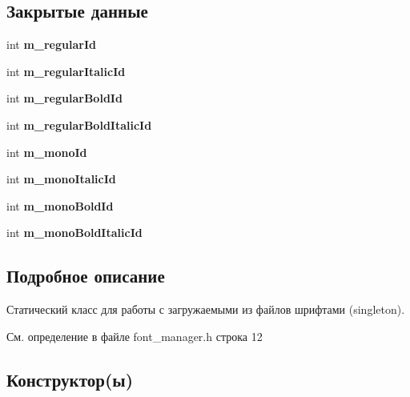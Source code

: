 \subsection*{Закрытые данные}
\begin{DoxyCompactItemize}
\item 
\hypertarget{class_font_manager_a646476403ee76b0ff2a1b6c8cd8dd167}{}\label{class_font_manager_a646476403ee76b0ff2a1b6c8cd8dd167} 
int {\bfseries m\+\_\+regular\+Id}
\item 
\hypertarget{class_font_manager_a378686fcdece0835591b5330dbc98523}{}\label{class_font_manager_a378686fcdece0835591b5330dbc98523} 
int {\bfseries m\+\_\+regular\+Italic\+Id}
\item 
\hypertarget{class_font_manager_a5cf5905c16f814e2b61bf847967d3f9c}{}\label{class_font_manager_a5cf5905c16f814e2b61bf847967d3f9c} 
int {\bfseries m\+\_\+regular\+Bold\+Id}
\item 
\hypertarget{class_font_manager_a8bc9ed18056f9d28de306175cb926d5e}{}\label{class_font_manager_a8bc9ed18056f9d28de306175cb926d5e} 
int {\bfseries m\+\_\+regular\+Bold\+Italic\+Id}
\item 
\hypertarget{class_font_manager_a39fd9ae79f9ca7fc2dcb12c12479a90a}{}\label{class_font_manager_a39fd9ae79f9ca7fc2dcb12c12479a90a} 
int {\bfseries m\+\_\+mono\+Id}
\item 
\hypertarget{class_font_manager_a64d1fa182fc3ae29936aa75017358543}{}\label{class_font_manager_a64d1fa182fc3ae29936aa75017358543} 
int {\bfseries m\+\_\+mono\+Italic\+Id}
\item 
\hypertarget{class_font_manager_ac5b8f48513accb75075f64bc856b0e45}{}\label{class_font_manager_ac5b8f48513accb75075f64bc856b0e45} 
int {\bfseries m\+\_\+mono\+Bold\+Id}
\item 
\hypertarget{class_font_manager_a9d4203ecc590815e7d09987099337a09}{}\label{class_font_manager_a9d4203ecc590815e7d09987099337a09} 
int {\bfseries m\+\_\+mono\+Bold\+Italic\+Id}
\end{DoxyCompactItemize}


\subsection{Подробное описание}
Статический класс для работы с загружаемыми из файлов шрифтами (singleton). 

См. определение в файле font\+\_\+manager.\+h строка 12



\subsection{Конструктор(ы)}
\hypertarget{class_font_manager_a2f89acd28b5bd24e747aacd3208131ef}{}\label{class_font_manager_a2f89acd28b5bd24e747aacd3208131ef} 

